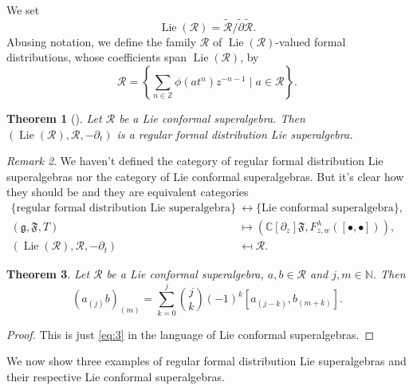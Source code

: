 \documentclass[a4paper, 12pt, reqno]{amsart}
\newtheorem{theorem}{Theorem}[section]
\theoremstyle{remark}
\newtheorem{remark}[theorem]{Remark}
\numberwithin{equation}{subsection}
\DeclareMathOperator{\Lie}{Lie}
\begin{document}
We set
\begin{equation*}
  \Lie(\mathcal{R}) = \widetilde{\mathcal{R}}/\widetilde{\partial}\widetilde{\mathcal{R}}.
\end{equation*}
Abusing notation, we define the family $\mathcal{R}$ of $\Lie(\mathcal{R})$-valued formal distributions, whose coefficients span $\Lie(\mathcal{R})$, by
\begin{equation*}
  \mathcal{R} = \left\{\sum_{n \in \mathbb{Z}}\phi(at^n)z^{-n - 1} \mid a \in \mathcal{R}\right\}.
\end{equation*}

\begin{theorem}[{\cite[Proposition 2.6.4]{nozaradan_introduction_2008}}]
  \label{thr:9}
  Let $\mathcal{R}$ be a Lie conformal superalgebra.
  Then $(\Lie(\mathcal{R}), \mathcal{R}, -\partial_t)$ is a regular formal distribution Lie superalgebra.
\end{theorem}

\begin{remark}
  \label{rmk:7}
  We haven't defined the category of regular formal distribution Lie superalgebras nor the category of Lie conformal superalgebras.
  But it's clear how they should be and they are equivalent categories
  \begin{align*}
    \{\text{regular formal distribution Lie superalgebra}\} &\leftrightarrow \{\text{Lie conformal superalgebra}\}, \\
    (\mathfrak{g}, \mathfrak{F}, T) &\mapsto (\mathbb{C}[\partial_z]\mathfrak{F}, F^{\lambda}_{z, w}([\bullet, \bullet])), \\
    (\Lie(\mathcal{R}), \mathcal{R}, -\partial_t) &\mapsfrom \mathcal{R}.
  \end{align*}
\end{remark}

\begin{theorem}
  \label{thr:10}
  Let $\mathcal{R}$ be a Lie conformal superalgebra, $a, b \in \mathcal{R}$ and $j, m \in \mathbb{N}$.
  Then
  \begin{equation*}
    (a_{(j)}b)_{(m)} = \sum_{k = 0}^j\binom{j}{k}(-1)^k[a_{(j - k)},b_{(m + k)}].
  \end{equation*}
\end{theorem}

\begin{proof}
  This is just \eqref{eq:3} in the language of Lie conformal superalgebras.
\end{proof}

We now show three examples of regular formal distribution Lie superalgebras and their respective Lie conformal superalgebras.
\end{document}
